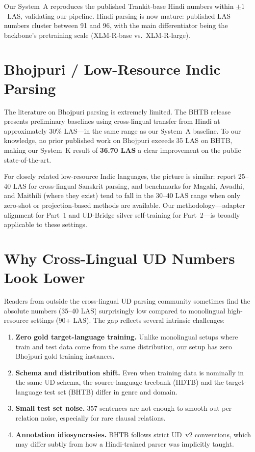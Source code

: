 \documentclass[12pt,a4paper,oneside]{report}
\begin{document}
Our System~A reproduces the published Trankit-base Hindi numbers within
$\pm 1$~LAS, validating our pipeline. Hindi parsing is now mature: published
LAS numbers cluster between 91 and 96, with the main differentiator being the
backbone's pretraining scale (XLM-R-base vs.\ XLM-R-large).

\section{Bhojpuri / Low-Resource Indic Parsing}

The literature on Bhojpuri parsing is extremely limited. The BHTB
release~\citep{bhtb2022} presents preliminary baselines using cross-lingual
transfer from Hindi at approximately 30\% LAS---in the same range as our
System~A baseline. To our knowledge, no prior published work on Bhojpuri
exceeds 35 LAS on BHTB, making our System~K result of \textbf{36.70 LAS} a
clear improvement on the public state-of-the-art.

For closely related low-resource Indic languages, the picture is similar:
\citet{ojha2019sanskrit} report 25--40 LAS for cross-lingual Sanskrit parsing,
and benchmarks for Magahi, Awadhi, and Maithili (where they exist) tend to
fall in the 30--40 LAS range when only zero-shot or projection-based methods
are available. Our methodology---adapter alignment for Part~1 and UD-Bridge
silver self-training for Part~2---is broadly applicable to these settings.

\section{Why Cross-Lingual UD Numbers Look Lower}

Readers from outside the cross-lingual UD parsing community sometimes find
the absolute numbers (35--40 LAS) surprisingly low compared to monolingual
high-resource settings (90+ LAS). The gap reflects several intrinsic
challenges:

\begin{enumerate}
  \item \textbf{Zero gold target-language training.} Unlike monolingual setups
        where train and test data come from the same distribution, our setup
        has zero Bhojpuri gold training instances.
  \item \textbf{Schema and distribution shift.} Even when training data is
        nominally in the same UD schema, the source-language treebank
        (HDTB) and the target-language test set (BHTB) differ in genre and
        domain.
  \item \textbf{Small test set noise.} 357 sentences are not enough to
        smooth out per-relation noise, especially for rare clausal relations.
  \item \textbf{Annotation idiosyncrasies.} BHTB follows strict UD~v2
        conventions, which may differ subtly from how a Hindi-trained parser
        was implicitly taught.
\end{enumerate}
\end{document}
